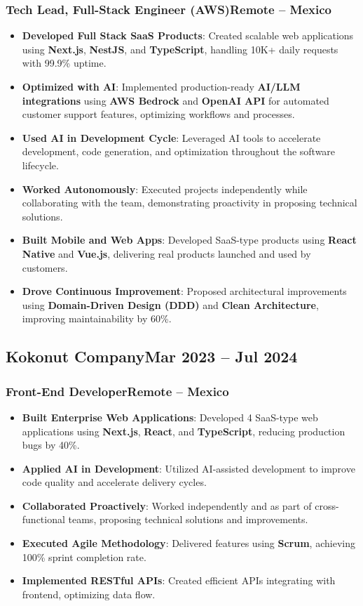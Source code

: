 \documentclass[a4paper,10pt]{article}
\newcommand{\kw}[1]{\textbf{\textcolor{keyword}{#1}}}
\newcommand{\tech}[1]{\textbf{\textcolor{tech}{#1}}}
\begin{document}
\subsubsection*{Tech Lead, Full-Stack Engineer (AWS)\hfill Remote -- Mexico}
\begin{itemize}[noitemsep, leftmargin=*]
    \item \textbf{Developed Full Stack SaaS Products}: Created scalable web applications using \tech{Next.js}, \tech{NestJS}, and \tech{TypeScript}, handling 10K+ daily requests with 99.9\% uptime.
    \item \textbf{Optimized with AI}: Implemented production-ready \kw{AI/LLM integrations} using \tech{AWS Bedrock} and \tech{OpenAI API} for automated customer support features, optimizing workflows and processes.
    \item \textbf{Used AI in Development Cycle}: Leveraged AI tools to accelerate development, code generation, and optimization throughout the software lifecycle.
    \item \textbf{Worked Autonomously}: Executed projects independently while collaborating with the team, demonstrating proactivity in proposing technical solutions.
    \item \textbf{Built Mobile and Web Apps}: Developed SaaS-type products using \tech{React Native} and \tech{Vue.js}, delivering real products launched and used by customers.
    \item \textbf{Drove Continuous Improvement}: Proposed architectural improvements using \kw{Domain-Driven Design (DDD)} and \kw{Clean Architecture}, improving maintainability by 60\%.
\end{itemize}

\subsection*{Kokonut Company\hfill\textbf{Mar 2023 -- Jul 2024}}
\subsubsection*{Front-End Developer\hfill Remote -- Mexico}
\begin{itemize}[noitemsep, leftmargin=*]
    \item \textbf{Built Enterprise Web Applications}: Developed 4 SaaS-type web applications using \tech{Next.js}, \tech{React}, and \tech{TypeScript}, reducing production bugs by 40\%.
    \item \textbf{Applied AI in Development}: Utilized AI-assisted development to improve code quality and accelerate delivery cycles.
    \item \textbf{Collaborated Proactively}: Worked independently and as part of cross-functional teams, proposing technical solutions and improvements.
    \item \textbf{Executed Agile Methodology}: Delivered features using \kw{Scrum}, achieving 100\% sprint completion rate.
    \item \textbf{Implemented RESTful APIs}: Created efficient APIs integrating with frontend, optimizing data flow.
\end{itemize}
\end{document}

